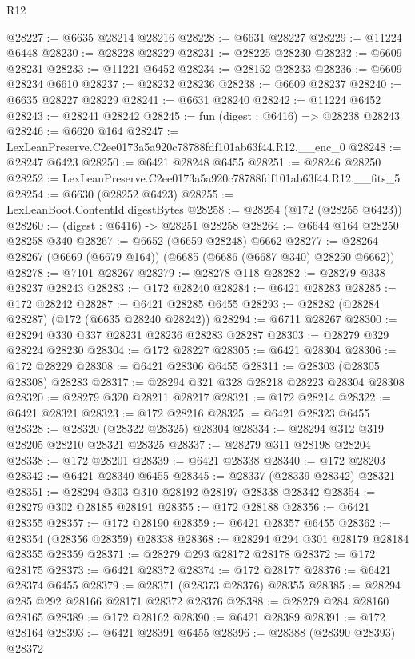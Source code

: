 \begin{lexlean}{R12}
\begin{coremodule}
@28227 := @6635 @28214 @28216
@28228 := @6631 @28227
@28229 := @11224 @6448
@28230 := @28228 @28229
@28231 := @28225 @28230
@28232 := @6609 @28231
@28233 := @11221 @6452
@28234 := @28152 @28233
@28236 := @6609 @28234 @6610
@28237 := @28232 @28236
@28238 := @6609 @28237
@28240 := @6635 @28227 @28229
@28241 := @6631 @28240
@28242 := @11224 @6452
@28243 := @28241 @28242
@28245 := fun (digest : @6416) => @28238 @28243
@28246 := @6620 @164
@28247 := LexLeanPreserve.C2ee0173a5a920c78788fdf101ab63f44.R12.__enc_0
@28248 := @28247 @6423
@28250 := @6421 @28248 @6455
@28251 := @28246 @28250
@28252 := LexLeanPreserve.C2ee0173a5a920c78788fdf101ab63f44.R12.__fits_5
@28254 := @6630 (@28252 @6423)
@28255 := LexLeanBoot.ContentId.digestBytes
@28258 := @28254 (@172 (@28255 @6423))
@28260 := (digest : @6416) -> @28251 @28258
@28264 := @6644 @164 @28250 @28258 @340
@28267 := @6652 (@6659 @28248) @6662
@28277 := @28264 @28267 (@6669 (@6679 @164)) (@6685 (@6686 (@6687 @340) @28250 @6662))
@28278 := @7101 @28267
@28279 := @28278 @118
@28282 := @28279 @338 @28237 @28243
@28283 := @172 @28240
@28284 := @6421 @28283
@28285 := @172 @28242
@28287 := @6421 @28285 @6455
@28293 := @28282 (@28284 @28287) (@172 (@6635 @28240 @28242))
@28294 := @6711 @28267
@28300 := @28294 @330 @337 @28231 @28236 @28283 @28287
@28303 := @28279 @329 @28224 @28230
@28304 := @172 @28227
@28305 := @6421 @28304
@28306 := @172 @28229
@28308 := @6421 @28306 @6455
@28311 := @28303 (@28305 @28308) @28283
@28317 := @28294 @321 @328 @28218 @28223 @28304 @28308
@28320 := @28279 @320 @28211 @28217
@28321 := @172 @28214
@28322 := @6421 @28321
@28323 := @172 @28216
@28325 := @6421 @28323 @6455
@28328 := @28320 (@28322 @28325) @28304
@28334 := @28294 @312 @319 @28205 @28210 @28321 @28325
@28337 := @28279 @311 @28198 @28204
@28338 := @172 @28201
@28339 := @6421 @28338
@28340 := @172 @28203
@28342 := @6421 @28340 @6455
@28345 := @28337 (@28339 @28342) @28321
@28351 := @28294 @303 @310 @28192 @28197 @28338 @28342
@28354 := @28279 @302 @28185 @28191
@28355 := @172 @28188
@28356 := @6421 @28355
@28357 := @172 @28190
@28359 := @6421 @28357 @6455
@28362 := @28354 (@28356 @28359) @28338
@28368 := @28294 @294 @301 @28179 @28184 @28355 @28359
@28371 := @28279 @293 @28172 @28178
@28372 := @172 @28175
@28373 := @6421 @28372
@28374 := @172 @28177
@28376 := @6421 @28374 @6455
@28379 := @28371 (@28373 @28376) @28355
@28385 := @28294 @285 @292 @28166 @28171 @28372 @28376
@28388 := @28279 @284 @28160 @28165
@28389 := @172 @28162
@28390 := @6421 @28389
@28391 := @172 @28164
@28393 := @6421 @28391 @6455
@28396 := @28388 (@28390 @28393) @28372

\end{coremodule}
\end{lexlean}
